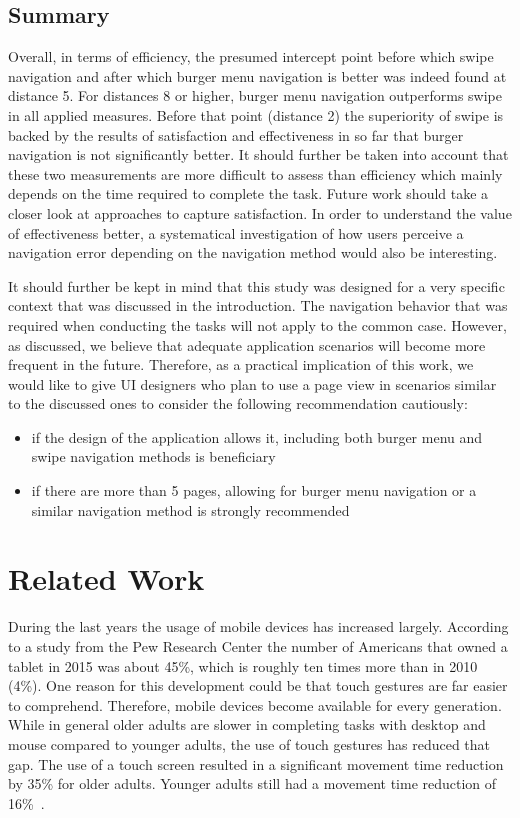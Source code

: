\documentclass{sig-alternate-05-2015}
\begin{document}
\subsection{Summary}
Overall, in terms of efficiency, the presumed intercept point before which swipe navigation and after which burger menu navigation is better was indeed found at 
distance 5. For distances 8 or higher, burger menu navigation outperforms swipe in all applied measures. 
Before that point (distance 2) the superiority of swipe is backed by the results of satisfaction and effectiveness in so far that burger navigation is not significantly 
better. It should further be taken into account that these two measurements are more difficult to assess than efficiency which mainly depends on the time required to complete the task. Future work
should take a closer look at approaches to capture satisfaction. In order to understand the value of effectiveness better, a systematical investigation of how users perceive
a navigation error depending on the navigation method would also be interesting.

It should further be kept in mind that this study was designed for a very specific context that was discussed in the introduction. The navigation behavior that was required
when conducting the tasks will not apply to the common case. However, as discussed, we believe that adequate application scenarios will become more frequent in the future. 
Therefore, as a practical implication of this work, we would like to give UI designers who plan to use a page view in scenarios similar to the discussed ones
to consider the following recommendation cautiously:
\begin{itemize}
  \item if the design of the application allows it, including both burger menu and swipe navigation methods is beneficiary
  \item if there are more than 5 pages, allowing for burger menu navigation or a similar navigation method is strongly recommended
\end{itemize}
\section{Related Work}
During the last years the usage of mobile devices has increased largely. 
According to a study from the Pew Research Center
the number of Americans that owned a tablet in 2015 was about 45\%, which is roughly ten times more than in 2010 (4\%). 
One reason for this development could be that touch gestures are far easier to comprehend. 
Therefore, mobile devices become available for every generation. 
While in general older adults are slower in completing tasks with desktop and mouse compared to younger adults, the use of touch gestures has reduced that gap. 
The use of a touch screen resulted in a significant movement time reduction by 35\% for older adults. 
Younger adults still had a movement time reduction of 16\%~\cite{findlater2013age}.
\end{document}

